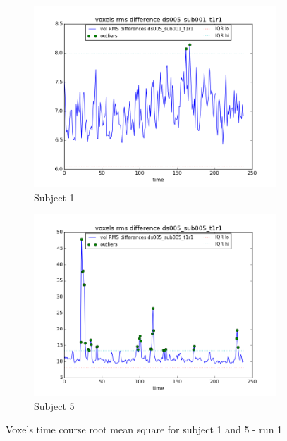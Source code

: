\begin{figure}[H]
\begin{subfigure}{.5\textwidth}
  \centering
  \includegraphics[width=.9\linewidth]{../fig/outliers/ds005_sub001_t1r1_vol_rms_outliers.png}
  \caption{Subject 1}
  \label{fig:rmsa}
\end{subfigure}%
\begin{subfigure}{.5\textwidth}
  \centering
  \includegraphics[width=.9\linewidth]{../fig/outliers/ds005_sub005_t1r1_vol_rms_outliers.png}
  \caption{Subject 5}
  \label{fig:rmsb}
\end{subfigure}
\caption{Voxels time course root mean square for subject 1 and 5 - run 1}
\label{fig:rms}
\end{figure}
